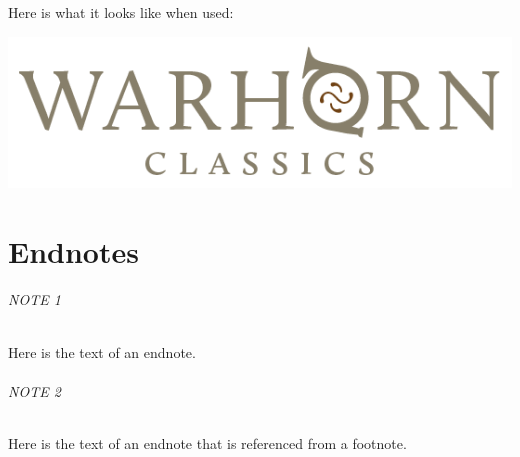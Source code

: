\documentclass[
]{book}
\begin{document}
Here is what it looks like when used:

\begin{center}\includegraphics[width=0.5\linewidth]{images/sepialogo} \end{center}

\hypertarget{endnotes-1}{%
\chapter*{Endnotes}\label{endnotes-1}}

\hypertarget{en.01}{%
\subparagraph*{NOTE 1}\label{en.01}}

Here is the text of an endnote.

\hypertarget{en.02}{%
\subparagraph*{NOTE 2}\label{en.02}}

Here is the text of an endnote that is referenced from a footnote.
\end{document}
